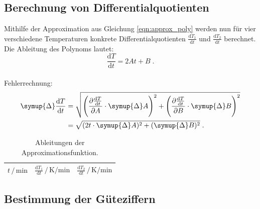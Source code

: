 \subsection{Berechnung von Differentialquotienten} %
Mithilfe der Approximation aus Gleichung \autoref{eqn:approx_poly} werden nun für vier verschiedene Temperaturen konkrete Differentialquotienten $\frac{\mathrm{d}T_1}{\mathrm{d}t}$ und $\frac{\mathrm{d}T_2}{\mathrm{d}t}$ berechnet.
Die Ableitung des Polynoms lautet:
\[
\frac{\mathrm{d}T}{\mathrm{d}t} = 2At + B \; .
\]
\\

Fehlerrechnung:
\begin{align*}
  \symup{\Delta} \frac{\mathrm{d}T}{\mathrm{d}t}
  &= \sqrt{\left(\frac{\partial \frac{\mathrm{d}T}{\mathrm{d}t}}{\partial A} \cdot \symup{\Delta} A\right)^2 + \left(\frac{\partial \frac{\mathrm{d}T}{\mathrm{d}t}}{\partial B} \cdot \symup{\Delta} B\right)^2} \\
  &= \sqrt{(2t \cdot \symup{\Delta} A)^2 + (\symup{\Delta} B)^2} \; .
\end{align*}

\begin{table}
\centering
\caption{Ableitungen der Approximationsfunktion.}
\label{tab:derivatives}
\begin{tabular}{c c c}
\toprule
$t \,/\, \si{\minute}$ &
$\frac{\mathrm{d}T_1}{\mathrm{d}t} \,/\, \si{\kelvin\per\minute}$ &
$\frac{\mathrm{d}T_2}{\mathrm{d}t} \,/\, \si{\kelvin\per\minute}$ \\
\midrule

\bottomrule
\end{tabular}
\end{table}


\subsection{Bestimmung der Güteziffern} %
\label{sec:auswertung_gueteziffern}

